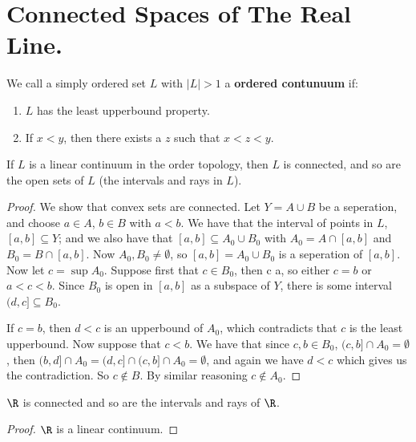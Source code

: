 
\section{Connected Spaces of The Real Line.}

\begin{definition}
    We call a simply ordered set $L$ with  $|L|>1$ a  \textbf{ordered contunuum} if:
        \begin{enumerate}[label=(\arabic*)]
            \item $L$ has the least upperbound property.

            \item If $x<y$, then there exists a  $z$ such that  $x<z<y$.
        \end{enumerate}
\end{definition}

\begin{theorem}\label{3.2.1}
    If $L$ is a linear continuum in the order topology, then  $L$ is connected, and so are the open
    sets of  $L$  (the intervals and rays in $L$).
\end{theorem}
\begin{proof}
    We show that convex sets are connected. Let $Y=A \cup B$ be a seperation, and choose  $a \in A$,
     $b \in B$ with  $a<b$. We have that the interval of points in  $L$,  $[a,b] \subseteq Y$; and
     we also have that $[a,b] \subseteq A_0 \cup B_0$ with $ A_0=A \cap [a,b]$ and $ B_0=B \cap
     [a,b]$. Now $ A_0,B_0 \neq \emptyset$, so $[a,b]=A_0 \cup B_0$ is a seperation of $[a,b]$. Now
     let $c=\sup{A_0}$. Suppose first that $c \in B_0$, then c \neq a, so either $c=b$ or  $a<c<b$.
     Since  $ B_0$ is open in $[a,b]$ as a subspace of $Y$, there is some interval  $(d,c] \subseteq
     B_0$.

     If $c=b$, then  $d<c$ is an upperbound of  $ A_0$, which contradicts that $c$ is the least
     upperbound. Now suppose that $c<b$. We have that since  $c,b \in B_0$, $(c,b] \cap A_0=
     \emptyset$, then $(b,d] \cap A_0=(d,c] \cap (c,b] \cap A_0 = \emptyset$, and again we have
     $d<c$ which gives us the contradiction. So  $c \notin B$. By similar reasoning  $c \notin A_0$.
\end{proof}
\begin{corollary}
    $\R$ is connected and so are the intervals and rays of  $\R$.
\end{corollary}
\begin{proof}
    $\R$ is a linear continuum.
\end{proof}

